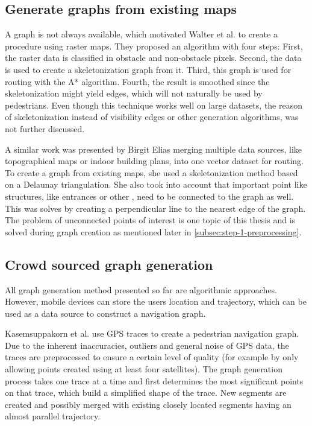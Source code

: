 	\subsection{Generate graphs from existing maps}
	\label{subsection:generate-graphs-from-maps}
	
		A graph is not always available, which motivated Walter et al. to create a procedure using raster maps\cite{walter-raster-maps}.
		They proposed an algorithm with four steps:
		First, the raster data is classified in obstacle and non-obstacle pixels.
		Second, the data is used to create a skeletonization graph from it.
		Third, this graph is used for routing with the A* algorithm.
		Fourth, the result is smoothed since the skeletonization might yield edges, which will not naturally be used by pedestrians.
		Even though this technique works well on large datasets, the reason of skeletonization instead of visibility edges or other generation algorithms, was not further discussed.
		
		A similar work was presented by Birgit Elias merging multiple data sources, like topographical maps or indoor building plans, into one vector dataset for routing\cite{elias-tailored-geodatabase}.
		To create a graph from existing maps, she used a skeletonization method based on a Delaunay triangulation.
		She also took into account that important point like structures, like entrances or other , need to be connected to the graph as well.
		This was solves by creating a perpendicular line to the nearest edge of the graph.
		The problem of unconnected points of interest is one topic of this thesis and is solved during graph creation as mentioned later in \cref{subsec:step-1-preprocessing}.
		
	\subsection{Crowd sourced graph generation}
	
		All graph generation method presented so far are algorithmic approaches.
		However, mobile devices can store the users location and trajectory, which can be used as a data source to construct a navigation graph.
		
		Kasemsuppakorn et al. use GPS traces to create a pedestrian navigation graph\cite{kasemsuppakorn-gps-traces-pedestrain-network}.
		Due to the inherent inaccuracies, outliers and general noise of GPS data, the traces are preprocessed to ensure a certain level of quality (for example by only allowing points created using at least four satellites).
		The graph generation process takes one trace at a time and first determines the most significant points on that trace, which build a simplified shape of the trace.
		New segments are created and possibly merged with existing closely located segments having an almost parallel trajectory.
		
